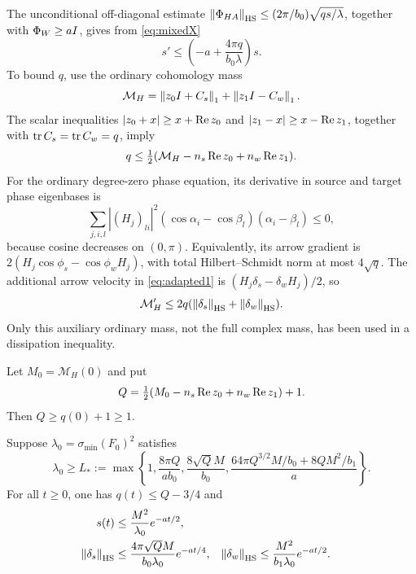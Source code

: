 The unconditional off-diagonal estimate
$\left\lVert\Phi_{HA}\right\rVert_{\mathrm{HS}}\leq(2\pi/b_0)\sqrt{qs/\lambda}$,
together with $\Phi_W\geq aI$, gives from \eqref{eq:mixedX}
\begin{equation}\label{eq:sineq}
 s'\leq\left(-a+\frac{4\pi q}{b_0\lambda}\right)s.
\end{equation}
To bound $q$, use the ordinary cohomology mass
\begin{equation}\label{eq:cohomass}
 \mathcal M_H=\left\lVert z_0I+C_s\right\rVert_1+\left\lVert z_1I-C_w\right\rVert_1.
\end{equation}
The scalar inequalities $|z_0+x|\geq x+\operatorname{Re} z_0$ and
$|z_1-x|\geq x-\operatorname{Re} z_1$, together with
$\operatorname{tr} C_s=\operatorname{tr} C_w=q$, imply
\begin{equation}\label{eq:qfrommass}
 q\leq\tfrac12(\mathcal M_H-n_s\operatorname{Re} z_0+n_w\operatorname{Re} z_1).
\end{equation}
For the ordinary degree-zero phase equation, its derivative in source
and target phase eigenbases is
\[
 \sum_{j,i,l}|(H_j)_{li}|^2
       (\cos\alpha_i-\cos\beta_l)(\alpha_i-\beta_l)\leq0,
\]
because cosine decreases on $(0,\pi)$.
Equivalently, its arrow gradient is
$2(H_j\cos\phi_s-\cos\phi_w H_j)$, with total
Hilbert--Schmidt norm at most $4\sqrt q$.
The additional arrow velocity in \eqref{eq:adapted1} is
$(H_j\delta_s-\delta_wH_j)/2$, so
\begin{equation}\label{eq:cohomassineq}
 \mathcal M_H'\leq2q(\left\lVert\delta_s\right\rVert_{\mathrm{HS}}+\left\lVert\delta_w\right\rVert_{\mathrm{HS}}).
\end{equation}
Only this auxiliary ordinary mass, not the full complex mass, has
been used in a dissipation inequality.

Let $M_0=\mathcal M_H(0)$ and put
\begin{equation}\label{eq:Qgeneral}
 Q=\tfrac12(M_0-n_s\operatorname{Re} z_0+n_w\operatorname{Re} z_1)+1.
\end{equation}
Then $Q\geq q(0)+1\geq1$.

\begin{proposition}\label{prop:bootstrap}
Suppose $\lambda_0=\sigma_{\min}(F_0)^2$ satisfies
\begin{equation}\label{eq:threshold}
 \lambda_0\geq L_*:=\max\left\{
 1,\frac{8\pi Q}{ab_0},\frac{8\sqrt Q M}{b_0},
 \frac{64\pi Q^{3/2}M/b_0+8QM^2/b_1}{a}\right\}.
\end{equation}
For all $t\geq0$, one has $q(t)\leq Q-3/4$ and
\begin{align}
 s(t)&\leq\frac{M^2}{\lambda_0}e^{-at/2},\label{eq:smixed}\\
 \left\lVert\delta_s\right\rVert_{\mathrm{HS}}
 &\leq\frac{4\pi\sqrt Q M}{b_0\lambda_0}e^{-at/4},
 &\left\lVert\delta_w\right\rVert_{\mathrm{HS}}
 &\leq\frac{M^2}{b_1\lambda_0}e^{-at/2}.\label{eq:deltamixed}
\end{align}
\end{proposition}

